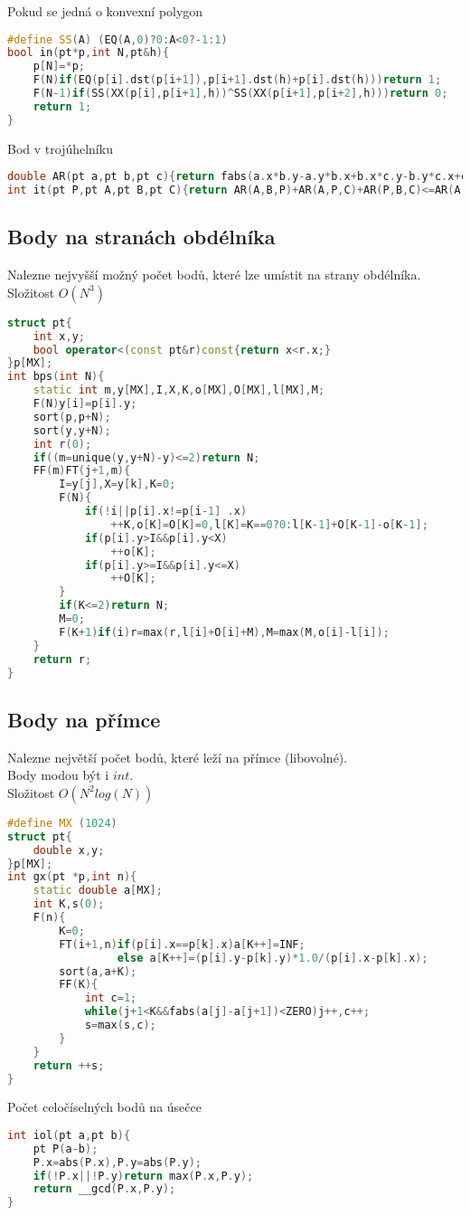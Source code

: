 \documentclass[11pt]{article}
\begin{document}
Pokud se jedná o konvexní polygon
\begin{lstlisting}[language=C++]
#define SS(A) (EQ(A,0)?0:A<0?-1:1)
bool in(pt*p,int N,pt&h){
    p[N]=*p;
    F(N)if(EQ(p[i].dst(p[i+1]),p[i+1].dst(h)+p[i].dst(h)))return 1;
    F(N-1)if(SS(XX(p[i],p[i+1],h))^SS(XX(p[i+1],p[i+2],h)))return 0;
    return 1;
}
\end{lstlisting}
Bod v trojúhelníku
\begin{lstlisting}[language=C++]
double AR(pt a,pt b,pt c){return fabs(a.x*b.y-a.y*b.x+b.x*c.y-b.y*c.x+c.x*a.y-c.y*a.x)/2;}
int it(pt P,pt A,pt B,pt C){return AR(A,B,P)+AR(A,P,C)+AR(P,B,C)<=AR(A,B,C)+ZERO;}
\end{lstlisting}
\subsection{Body na stranách obdélníka}
Nalezne nejvyšší možný počet bodů, které lze umístit na strany obdélníka.
\\Složitost $O(N^3)$
\begin{lstlisting}[language=C++]
struct pt{
    int x,y;
    bool operator<(const pt&r)const{return x<r.x;}
}p[MX];
int bps(int N){
    static int m,y[MX],I,X,K,o[MX],O[MX],l[MX],M;
    F(N)y[i]=p[i].y;
    sort(p,p+N);
    sort(y,y+N);
    int r(0);
    if((m=unique(y,y+N)-y)<=2)return N;
    FF(m)FT(j+1,m){
        I=y[j],X=y[k],K=0;
        F(N){
            if(!i||p[i].x!=p[i-1] .x)
                ++K,o[K]=O[K]=0,l[K]=K==0?0:l[K-1]+O[K-1]-o[K-1];
            if(p[i].y>I&&p[i].y<X)
                ++o[K];
            if(p[i].y>=I&&p[i].y<=X)
                ++O[K];
        }
        if(K<=2)return N;
        M=0;
        F(K+1)if(i)r=max(r,l[i]+O[i]+M),M=max(M,o[i]-l[i]);
    }
    return r;
}
\end{lstlisting}
\subsection{Body na přímce}
Nalezne největší počet bodů, které leží na přímce (libovolné).
\\Body modou být i $int$.
\\Složitost $O(N^2log(N))$
\begin{lstlisting}[language=C++]
#define MX (1024)
struct pt{
    double x,y;
}p[MX];
int gx(pt *p,int n){
    static double a[MX];
    int K,s(0);
    F(n){
        K=0;
        FT(i+1,n)if(p[i].x==p[k].x)a[K++]=INF;
                 else a[K++]=(p[i].y-p[k].y)*1.0/(p[i].x-p[k].x);
        sort(a,a+K);
        FF(K){
            int c=1;
            while(j+1<K&&fabs(a[j]-a[j+1])<ZERO)j++,c++;
            s=max(s,c);
        }
    }
    return ++s;
}
\end{lstlisting}
Počet celočíselných bodů na úsečce
\begin{lstlisting}[language=C++]
int iol(pt a,pt b){
    pt P(a-b);
    P.x=abs(P.x),P.y=abs(P.y);
    if(!P.x||!P.y)return max(P.x,P.y);
    return __gcd(P.x,P.y);
}
\end{lstlisting}
\end{document}

